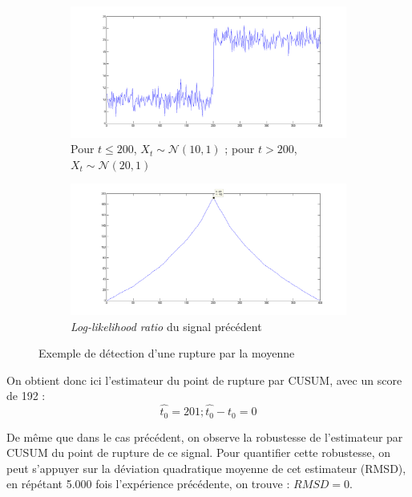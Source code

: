 \documentclass[french,11pt,notitlepage]{report}
\begin{document}
	\begin{figure}[h]	
		\begin{subfigure}[t]{.49\textwidth}

  \includegraphics[width=\linewidth]{test_signal_mean.png}
		\caption{Pour $t \leq 200$, $X_t \sim \mathcal{N}(10, 1)$ ; pour $t > 200$, $X_t \sim \mathcal{N}(20, 1)$}
		\label{test_signal_mean}
	\end{subfigure}
	\hfill
	\begin{subfigure}[t]{.49\textwidth}

  \includegraphics[width=\linewidth]{llr_test_mean.png}
		\caption{\textit{Log-likelihood ratio} du signal précédent}
		\label{llr_test_mean}
	\end{subfigure}
	
	\caption{Exemple de détection d'une rupture par la moyenne}
	\end{figure}
	
	On obtient donc ici l'estimateur du point de rupture par CUSUM, avec un score de 192 :
	\begin{equation*}
		\hat{t_0} = 201 ; \hat{t_0} - t_0 = 0
	\end{equation*}
	
	De même que dans le cas précédent, on observe la robustesse de l'estimateur par CUSUM du point de rupture de ce signal. Pour quantifier cette robustesse, on peut s'appuyer sur la déviation quadratique moyenne de cet estimateur (RMSD), en répétant 5.000 fois l'expérience précédente, on trouve : $RMSD = 0$.
	
\end{document}
